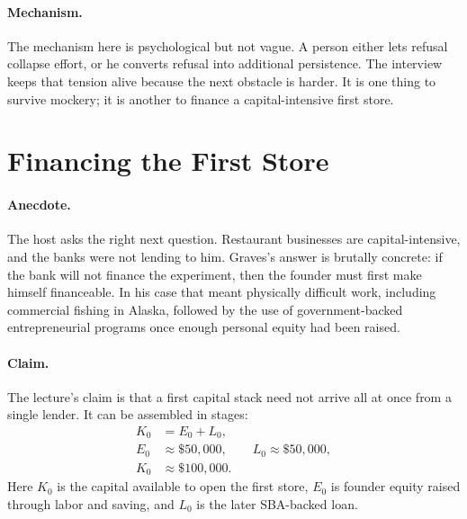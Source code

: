 \paragraph{Mechanism.}
The mechanism here is psychological but not vague. A person either lets refusal collapse effort, or he converts refusal into additional persistence. The interview keeps that tension alive because the next obstacle is harder. It is one thing to survive mockery; it is another to finance a capital-intensive first store.

\section{Financing the First Store}

\paragraph{Anecdote.}
The host asks the right next question. Restaurant businesses are capital-intensive, and the banks were not lending to him. Graves's answer is brutally concrete: if the bank will not finance the experiment, then the founder must first make himself financeable. In his case that meant physically difficult work, including commercial fishing in Alaska, followed by the use of government-backed entrepreneurial programs once enough personal equity had been raised.

\paragraph{Claim.}
The lecture's claim is that a first capital stack need not arrive all at once from a single lender. It can be assembled in stages:
\begin{align}
K_0 &= E_0 + L_0,\\
E_0 &\approx \$50{,}000,\qquad L_0 \approx \$50{,}000,\\
K_0 &\approx \$100{,}000.
\end{align}
Here \(K_0\) is the capital available to open the first store, \(E_0\) is founder equity raised through labor and saving, and \(L_0\) is the later SBA-backed loan.

